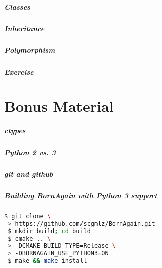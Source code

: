 \documentclass[hyperref={colorlinks, linkcolor=blue, urlcolor=blue}]{beamer}
\begin{document}
\begin{frame}
  \frametitle{Classes}
\end{frame}

\begin{frame}
  \frametitle{Inheritance}
\end{frame}

\begin{frame}
  \frametitle{Polymorphism}
\end{frame}

\begin{frame}
  \frametitle{Exercise}
\end{frame}


\part{Bonus Material} 

\begin{frame}
  \frametitle{ctypes}
\end{frame}

\begin{frame}
  \frametitle{Python 2 vs. 3}
\end{frame}

\begin{frame}
  \frametitle{git and github}
\end{frame}

\begin{frame}[fragile]
  \frametitle{Building BornAgain with Python 3 support}
    \begin{lstlisting}[language=bash]
 $ git clone \
 > https://github.com/scgmlz/BornAgain.git
 $ mkdir build; cd build
 $ cmake .. \
 > -DCMAKE_BUILD_TYPE=Release \
 > -DBORNAGAIN_USE_PYTHON3=ON
 $ make && make install
    \end{lstlisting}



\end{frame}


\end{document}
